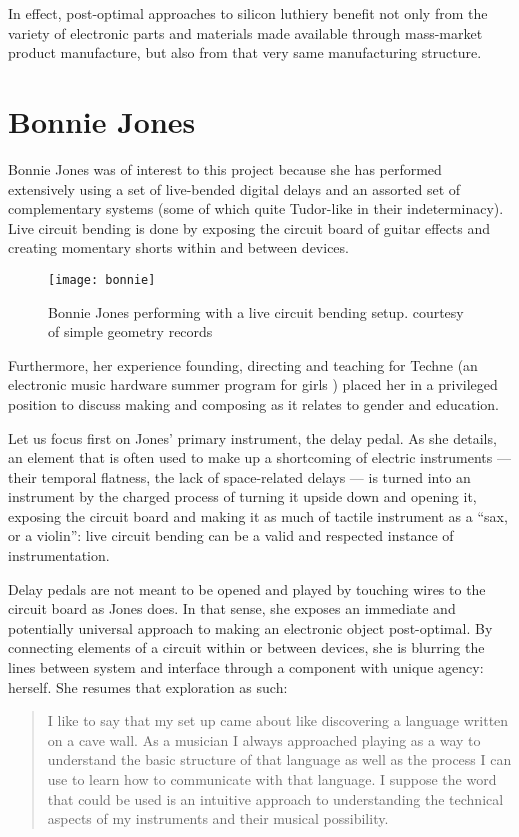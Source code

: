 In effect, post-optimal approaches to silicon luthiery benefit not only from the variety of electronic parts and materials made available through mass-market product manufacture, but also from that very same manufacturing structure. 

\section{Bonnie Jones}

Bonnie Jones was of interest to this project because she has performed extensively using a set of live-bended digital delays and an assorted set of complementary systems (some of which quite Tudor-like in their indeterminacy). Live circuit bending is done by exposing the circuit board of guitar effects and creating momentary shorts within and between devices. 

\begin{figure}[hbt]
  \texttt{[image: bonnie]}
  \caption{Bonnie Jones performing with a live circuit bending setup. courtesy of simple geometry records}
\end{figure}

Furthermore, her experience founding, directing and teaching for Techne (an electronic music hardware summer program for girls \citep{techne}) placed her in a privileged position to discuss making and composing as it relates to gender and education. 

Let us focus first on Jones' primary instrument, the delay pedal. As she details, an element that is often used to make up a shortcoming of electric instruments — their temporal flatness, the lack of space-related delays — is turned into an instrument by the charged process of turning it upside down and opening it, exposing the circuit board and making it as much of tactile instrument as a ``sax, or a violin'':  live circuit bending can be a valid and respected instance of instrumentation. 

Delay pedals are not meant to be opened and played by touching wires to the circuit board as Jones does. In that sense, she exposes an immediate and potentially universal approach to making an electronic object post-optimal. By connecting elements of a circuit within or between devices, she is blurring the lines between system and interface through a component with unique agency: herself. She resumes that exploration as such: 

\begin{quote}
	I like to say that my set up came about like discovering a language written on a cave wall. As a musician I always approached playing as a way to understand the basic structure of that language as well as the process I can use to learn how to communicate with that language. I suppose the word that could be used is an intuitive approach to understanding the technical aspects of my instruments and their musical possibility.
\end{quote}

